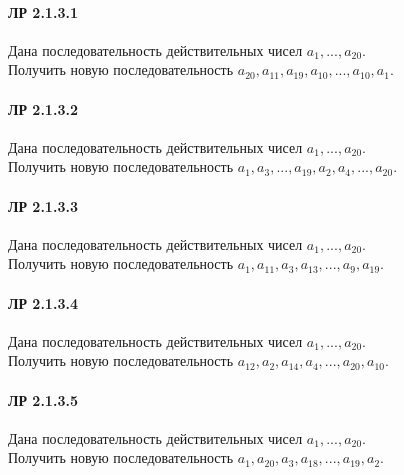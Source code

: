 \documentclass[12pt,a4paper]{report}
\begin{document}
\clearpage
\paragraph*{ЛР 2.1.3.1} Дана последовательность действительных чисел $a_1, ..., a_{20}$. \\
Получить новую последовательность $a_{20}, a_{11}, a_{19}, a_{10}, ..., a_{10}, a_1$.
\paragraph*{ЛР 2.1.3.2} Дана последовательность действительных чисел $a_1, ..., a_{20}$. \\
Получить новую последовательность  $a_1, a_3, ..., a_{19}, a_2, a_4, ..., a_{20}$.
\paragraph*{ЛР 2.1.3.3} Дана последовательность действительных чисел $a_1, ..., a_{20}$. \\
Получить новую последовательность  $a_1, a_{11}, a_3, a_{13}, ..., a_9, a_{19}$.
\paragraph*{ЛР 2.1.3.4} Дана последовательность действительных чисел $a_1, ..., a_{20}$. \\
Получить новую последовательность  $a_{12}, a_2, a_{14}, a_4, ..., a_{20}, a_{10}$.
\paragraph*{ЛР 2.1.3.5} Дана последовательность действительных чисел $a_1, ..., a_{20}$. \\
Получить новую последовательность  $a_1, a_{20}, a_3, a_{18}, ..., a_{19}, a_2$.





\clearpage
\end{document}
